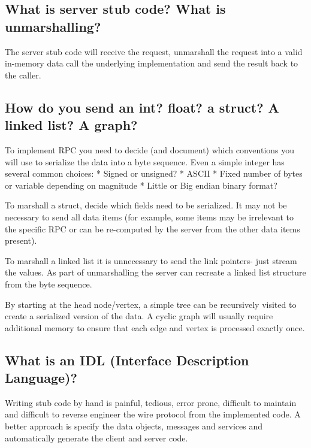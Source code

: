 \subsection{What is server stub code? What is
unmarshalling?}\label{what-is-server-stub-code-what-is-unmarshalling}

The server stub code will receive the request, unmarshall the request
into a valid in-memory data call the underlying implementation and send
the result back to the caller.

\subsection{How do you send an int? float? a struct? A linked list? A
graph?}\label{how-do-you-send-an-int-float-a-struct-a-linked-list-a-graph}

To implement RPC you need to decide (and document) which conventions you
will use to serialize the data into a byte sequence. Even a simple
integer has several common choices: * Signed or unsigned? * ASCII *
Fixed number of bytes or variable depending on magnitude * Little or Big
endian binary format?

To marshall a struct, decide which fields need to be serialized. It may
not be necessary to send all data items (for example, some items may be
irrelevant to the specific RPC or can be re-computed by the server from
the other data items present).

To marshall a linked list it is unnecessary to send the link pointers-
just stream the values. As part of unmarshalling the server can recreate
a linked list structure from the byte sequence.

By starting at the head node/vertex, a simple tree can be recursively
visited to create a serialized version of the data. A cyclic graph will
usually require additional memory to ensure that each edge and vertex is
processed exactly once.

\subsection{What is an IDL (Interface Description
Language)?}\label{what-is-an-idl-interface-description-language}

Writing stub code by hand is painful, tedious, error prone, difficult to
maintain and difficult to reverse engineer the wire protocol from the
implemented code. A better approach is specify the data objects,
messages and services and automatically generate the client and server
code.

